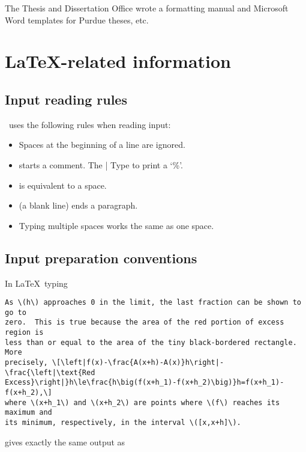 The
Thesis and Dissertation Office
\cite{thesis-and-dissertation-office-resources}
wrote a formatting manual
\cite{thesis2017}
and Microsoft Word templates
\cite{thesis2020}
for Purdue theses,
etc.


\section{\LaTeX-related information}

\subsection{Input reading rules}

\LaTeXLogo\ uses the following rules when reading input:
\begin{itemize}
  \item
    Spaces at the beginning of a line are ignored.
  \item
    \Keys{\sffamily\%} starts a comment.
    The |%
    Type  \Keys{\sffamily\%} to print a `\%'.
  \item
     is equivalent to a space.
  \item
      (a blank line) ends a paragraph.
  \item
    Typing multiple spaces works the same as one space.
\end{itemize}


\subsection{Input preparation conventions}

In \LaTeX\ typing

\begin{verbatim}
As \(h\) approaches 0 in the limit, the last fraction can be shown to go to
zero.  This is true because the area of the red portion of excess region is
less than or equal to the area of the tiny black-bordered rectangle.  More
precisely, \[\left|f(x)-\frac{A(x+h)-A(x)}h\right|-\frac{\left|\text{Red
Excess}\right|}h\le\frac{h\big(f(x+h_1)-f(x+h_2)\big)}h=f(x+h_1)-f(x+h_2),\]
where \(x+h_1\) and \(x+h_2\) are points where \(f\) reaches its maximum and
its minimum, respectively, in the interval \([x,x+h]\).
\end{verbatim}
\noindent gives exactly the same output as

